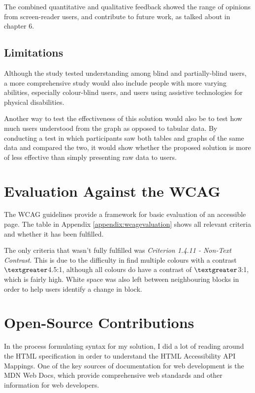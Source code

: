 \documentclass[ %
                    author={Aleena Baig},
                supervisor={Dr Simon Lock},
                    degree={BSc},
                     title={On Making Web Accessible Graphs},
                  subtitle={},
                      year={2019} ]{dissertation}
\begin{document}
The combined quantitative and qualitative feedback showed the range of opinions from screen-reader users, and contribute to future work, as talked about in chapter 6.

\subsection{Limitations}

Although the study tested understanding among blind and partially-blind users, a more comprehensive study would also include people with more varying abilities, especially colour-blind users, and users using assistive technologies for physical disabilities.

Another way to test the effectiveness of this solution would also be to test how much users understood from the graph as opposed to tabular data. By conducting a test in which participants saw both tables and graphs of the same data and compared the two, it would show whether the proposed solution is more of less effective than simply presenting raw data to users.

\section{Evaluation Against the WCAG}

The WCAG guidelines provide a framework for basic evaluation of an accessible page. The table in Appendix \ref{appendix:wcagevaluation} shows all relevant criteria and whether it has been fulfilled.

The only criteria that wasn't fully fulfilled was \textit{Criterion 1.4.11 - Non-Text Contrast}. This is due to the difficulty in find multiple colours with a contrast $\textgreater$4.5:1, although all colours do have a contrast of $\textgreater$3:1, which is fairly high. White space was also left between neighbouring blocks in order to help users identify a change in block.

\section{Open-Source Contributions}

In the process formulating syntax for my solution, I did a lot of reading around the HTML specification\cite{htmlspec} in order to understand the HTML Accessibility API Mappings. One of the key sources of documentation for web development is the MDN Web Docs\cite{mdndocs}, which provide comprehensive web standards and other information for web developers.
\end{document}

